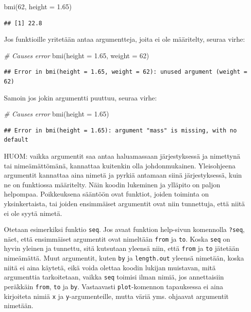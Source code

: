 \documentclass[
]{book}
\newenvironment{Shaded}{\begin{snugshade}}{\end{snugshade}}
\newcommand{\AttributeTok}[1]{\textcolor[rgb]{0.77,0.63,0.00}{#1}}
\newcommand{\CommentTok}[1]{\textcolor[rgb]{0.56,0.35,0.01}{\textit{#1}}}
\newcommand{\DecValTok}[1]{\textcolor[rgb]{0.00,0.00,0.81}{#1}}
\newcommand{\FloatTok}[1]{\textcolor[rgb]{0.00,0.00,0.81}{#1}}
\newcommand{\FunctionTok}[1]{\textcolor[rgb]{0.00,0.00,0.00}{#1}}
\newcommand{\NormalTok}[1]{#1}
\begin{document}
\begin{Shaded}
\begin{Highlighting}[]
\FunctionTok{bmi}\NormalTok{(}\DecValTok{62}\NormalTok{, }\AttributeTok{height =} \FloatTok{1.65}\NormalTok{)}
\end{Highlighting}
\end{Shaded}

\begin{verbatim}
## [1] 22.8
\end{verbatim}

Jos funktioille yritetään antaa argumentteja, joita ei ole määritelty, seuraa virhe:

\begin{Shaded}
\begin{Highlighting}[]
\CommentTok{\# Causes error}
\FunctionTok{bmi}\NormalTok{(}\AttributeTok{height =} \FloatTok{1.65}\NormalTok{, }\AttributeTok{weight =} \DecValTok{62}\NormalTok{)}
\end{Highlighting}
\end{Shaded}

\begin{verbatim}
## Error in bmi(height = 1.65, weight = 62): unused argument (weight = 62)
\end{verbatim}

Samoin jos jokin argumentti puuttuu, seuraa virhe:

\begin{Shaded}
\begin{Highlighting}[]
\CommentTok{\# Causes error}
\FunctionTok{bmi}\NormalTok{(}\AttributeTok{height =} \FloatTok{1.65}\NormalTok{)}
\end{Highlighting}
\end{Shaded}

\begin{verbatim}
## Error in bmi(height = 1.65): argument "mass" is missing, with no default
\end{verbatim}

HUOM: vaikka argumentit saa antaa haluamassaan järjestyksessä ja nimettynä tai nimeämättömänä, kannattaa kuitenkin olla johdonmukainen. Yleisohjeena argumentit kannattaa aina nimetä ja pyrkiä antamaan siinä järjestyksessä, kuin ne on funktiossa määritelty. Näin koodin lukeminen ja ylläpito on paljon helpompaa. Poikkeuksena sääntöön ovat funktiot, joiden toiminta on yksinkertaista, tai joiden ensimmäiset argumentit ovat niin tunnettuja, että niitä ei ole syytä nimetä.

Otetaan esimerkiksi funktio \texttt{seq}. Jos avaat funktion help-sivun komennolla \texttt{?seq}, näet, että ensimmäiset argumentit ovat nimeltään \texttt{from} ja \texttt{to}. Koska \texttt{seq} on hyvin yleinen ja tunnettu, sitä kutsutaan yleensä niin, että \texttt{from} ja \texttt{to} jätetään nimeämättä. Muut argumentit, kuten \texttt{by} ja \texttt{length.out} yleensä nimetään, koska niitä ei aina käytetä, eikä voida olettaa koodin lukijan muistavan, mitä argumenttia tarkoitetaan, vaikka \texttt{seq} toimisi ilman nimiä, jos annettaisiin peräkkäin \texttt{from}, \texttt{to} ja \texttt{by}. Vastaavasti \texttt{plot}-komennon tapauksessa ei aina kirjoiteta nimiä \texttt{x} ja \texttt{y}-argumenteille, mutta väriä yms. ohjaavat argumentit nimetään.
\end{document}

